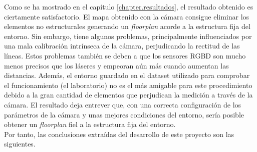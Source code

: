 Como se ha mostrado en el capítulo \ref{chapter.resultados}, el resultado obtenido es ciertamente satisfactorio. El mapa obtenido con la cámara consigue eliminar los elementos no estructurales generando un \textit{floorplan} acorde a la estructura fija del entorno. Sin embargo, tiene algunos problemas, principalmente influenciados por una mala calibración intrínseca de la cámara, perjudicando la rectitud de las líneas. Estos problemas también se deben a que los sensores RGBD son mucho menos precisos que los láseres y empeoran aún más cuando aumentan las distancias. Además, el entorno guardado en el dataset utilizado para comprobar el funcionamiento (el laboratorio) no es el más amigable para este procedimiento debido a la gran cantidad de elementos que perjudican la medición a través de la cámara. El resultado deja entrever que, con una correcta configuración de los parámetros de la cámara y unas mejores condiciones del entorno, sería posible obtener un  \textit{floorplan} fiel a la estructura fija del entorno.\\

Por tanto, las conclusiones extraídas del desarrollo de este proyecto son las siguientes.

